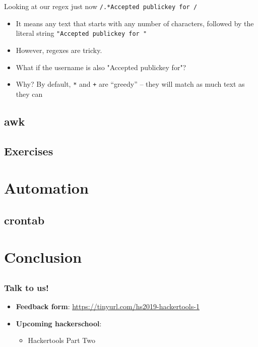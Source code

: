 \documentclass[12pt]{beamer}
\begin{document}
\begin{frame}{Looking at our regex just now}
  \texttt{/.*Accepted publickey for /}

  \begin{itemize}
    \item It means any text that starts with any number of characters, followed by the literal string \texttt{"Accepted publickey for "}
    \item However, regexes are tricky.
    \item What if the username is also "Accepted publickey for"?
    \item Why? By default, \texttt{*} and \texttt{+} are ``greedy'' -- they will match as much text as they can
  \end{itemize}
\end{frame}

\subsection{awk}

\subsection{Exercises}

\section{Automation}
\subsection{crontab}


\section{Conclusion}
\subsection{}
\begin{frame}
  \frametitle{Talk to us!}
  \begin{itemize}
    \item \textbf{Feedback form}: \url{https://tinyurl.com/hs2019-hackertools-1}
    \item \textbf{Upcoming hackerschool}:
          \begin{itemize}
            \item Hackertools Part Two
          \end{itemize}
  \end{itemize}
\end{frame}
\end{document}
